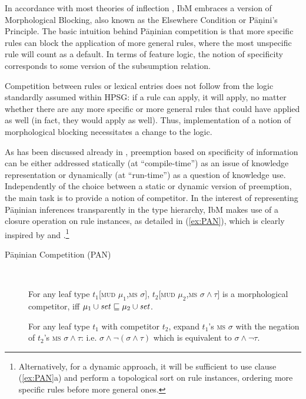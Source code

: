 \documentclass[output=paper,biblatex,babelshorthands,newtxmath,draftmode,colorlinks,citecolor=brown]{langscibook}
\begin{document}
\begin{exe}
\begin{xlist}
\begin{exe}
\begin{xlist}
In accordance with most theories of inflection
\citep{Prince93,Stump01,Anderson92,Noyer92,kiparsky_p85}, IbM embraces
a version of Morphological Blocking, also known as the Elsewhere Condition
\citep{kiparsky_p85} or Pāṇini's Principle. The basic intuition behind
Pāṇinian competition is that more specific rules can block the
application of more general rules, where the most unspecific rule will
count as a default. In terms of feature logic, the notion of
specificity corresponds to some version of the subsumption relation.

Competition between rules or lexical entries does not follow from the
logic standardly assumed within HPSG: if a rule can apply, it will
apply, no matter whether there are any more specific or more general
rules that could have applied as well (in fact, they would apply as
well). Thus, implementation of a notion of morphological blocking
necessitates a change to the logic.

As has been discussed already in \citet{Koenig99}, preemption based on
specificity of information can be either addressed statically (at
``compile-time'') as an issue of knowledge representation or
dynamically (at ``run-time'') as a question of knowledge
use. Independently of the choice between a static or dynamic version
of preemption, the main task is to provide a notion of competitor.  In
the interest of representing Pāṇinian inferences transparently in the
type hierarchy, IbM makes use of a closure operation on rule
instances, as detailed in (\ref{ex:PAN}), which is clearly inspired by
\citet{Koenig99} and \citet{Erjavec94}.\footnote{Alternatively, for 
a dynamic approach, it will be sufficient to use clause
(\ref{ex:PAN}a) and perform a topological sort on rule instances,
ordering  more specific rules before more general ones.}

\begin{samepage}
  \begin{exe}
    \ex \label{ex:PAN}\begin{description}
    \item[Pāṇinian Competition (PAN)] \mbox{~}
      \begin{xlist}
        \ex For any leaf type $t_1$[\textsc{mud} $\mu_1$,\textsc{ms}
        $\sigma$], $t_2$[\textsc{mud} $\mu_2$,\textsc{ms}
        $\sigma \wedge \tau$] is a morphological competitor, iff
        $\mu_1 \cup \mbox{\textit{set}} \sqsubseteq \mu_2 \cup \mbox{\textit{set}}$.
    
        \ex For any leaf type $t_1$ with competitor $t_2$, expand
        $t_1$'s \textsc{ms} $\sigma$ with the negation of $t_2$'s
        \textsc{ms} $\sigma \wedge \tau$: i.e.
        $\sigma \wedge \neg(\sigma \wedge \tau)$ which is equivalent
        to $\sigma \wedge
        \neg \tau$.
      \end{xlist}
    \end{description}
  \end{exe}
\end{samepage}


\end{xlist}
\end{exe}
\end{xlist}
\end{exe}
\end{document}
